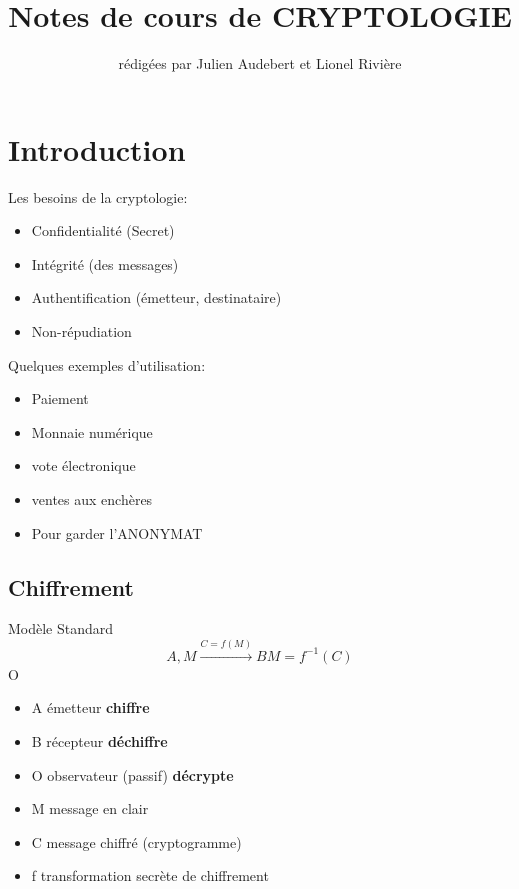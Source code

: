 \documentclass[12pt,a4paper]{article}
\title{Notes de cours de CRYPTOLOGIE}
\author{rédigées par Julien Audebert et Lionel Rivière}
\begin{document}
\maketitle

\tableofcontents

\newpage 

\section{Introduction}

Les besoins de la cryptologie:
\begin{itemize}
\item Confidentialité (Secret)
\item Intégrité (des messages)
\item Authentification (émetteur, destinataire)
\item Non-répudiation
\end{itemize}

Quelques exemples d'utilisation:
\begin{itemize}
\item Paiement
\item Monnaie numérique
\item vote électronique
\item ventes aux enchères
\item Pour garder l'ANONYMAT
\end{itemize}

\subsection{Chiffrement}

\begin{center}
Modèle Standard
\begin{displaymath}
A,M \stackrel{C=f(M)}{\longrightarrow} B M=f^{-1}(C)
\end{displaymath}
O
\end{center}

\begin{itemize}
\item A émetteur \textbf{chiffre}
\item B récepteur \textbf{déchiffre}
\item O observateur (passif) \textbf{décrypte}
\item M message en clair
\item C message chiffré (cryptogramme)
\item f transformation secrète de chiffrement
\end{itemize}
\end{document}
